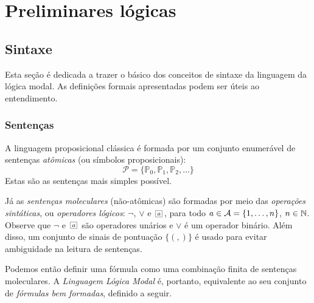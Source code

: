 




\section{Preliminares lógicas}
\subsection{Sintaxe}
\label{sec:sintaxe}

Esta seção é dedicada a trazer o básico dos conceitos de sintaxe da linguagem da
lógica modal. As definições formais apresentadas podem ser úteis ao
entendimento.

\subsubsection{Sentenças} 
A linguagem proposicional clássica é formada por um conjunto enumerável de sentenças
\textit{at\^omicas} (ou símbolos proposicionais): 
\begin{equation}
\label{simb_prop}
    \mathcal{P} = \{\mathbb{P}_0, \mathbb{P}_1, \mathbb{P}_2, \ldots\}
\end{equation}
Estas são as sentenças mais simples possível.

Já as \textit{sentenças moleculares} (não-at\^omicas) são formadas por meio das
\textit{operações sintáticas}, ou \textit{operadores lógicos}: $\neg$, $\vee$ e
$\nec{\agent}$, para todo $a \in {\cal{A}} = \{1,\ldots, n\}$, $n \in \mbox{$\mathbb N$}$.
Observe que $\neg$ e $\nec{\agent}$ são operadores unários e $\vee$ é um operador
binário. Além disso, um conjunto de sinais de pontuação $\{(,)\}$ é usado para
evitar ambiguidade na leitura de sentenças.

Podemos então definir uma fórmula como uma combinação finita de sentenças
moleculares. A \textit{Linguagem Lógica Modal} é, portanto, equivalente ao seu
conjunto de \textit{fórmulas bem formadas}, definido a seguir.

